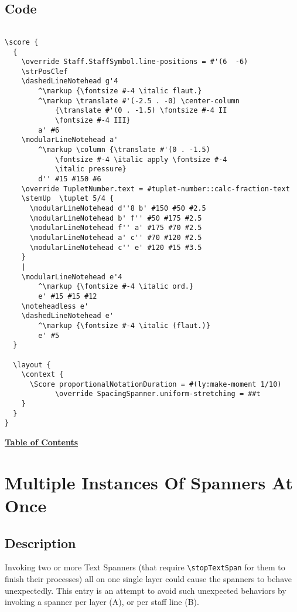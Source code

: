 \subsection{Code}
\begin{verbatim}

\score {
  {
    \override Staff.StaffSymbol.line-positions = #'(6  -6)
    \strPosClef 
    \dashedLineNotehead g'4
    	^\markup {\fontsize #-4 \italic flaut.}
    	^\markup \translate #'(-2.5 . -0) \center-column 
			{\translate #'(0 . -1.5) \fontsize #-4 II 
			\fontsize #-4 III} 
		a' #6
    \modularLineNotehead a'
    	^\markup \column {\translate #'(0 . -1.5) 
			\fontsize #-4 \italic apply \fontsize #-4 
			\italic pressure} 
		d'' #15 #150 #6
    \override TupletNumber.text = #tuplet-number::calc-fraction-text
    \stemUp  \tuplet 5/4 {
      \modularLineNotehead d''8 b' #150 #50 #2.5
      \modularLineNotehead b' f'' #50 #175 #2.5
      \modularLineNotehead f'' a' #175 #70 #2.5
      \modularLineNotehead a' c'' #70 #120 #2.5
      \modularLineNotehead c'' e' #120 #15 #3.5
    }
    |
    \modularLineNotehead e'4
    	^\markup {\fontsize #-4 \italic ord.} 
		e' #15 #15 #12
    \noteheadless e'
    \dashedLineNotehead e'
    	^\markup {\fontsize #-4 \italic (flaut.)} 
		e' #5
  }

  \layout {
    \context {
      \Score proportionalNotationDuration = #(ly:make-moment 1/10)    
      		\override SpacingSpanner.uniform-stretching = ##t
    }
  }
}

\end{verbatim}

\hyperref[sec:toc]{\textbf{Table of Contents}}

\vfill \break


\section {Multiple Instances Of Spanners At Once}
\label{sec:comb_spanners}
\hfill
{}
\hfill

\subsection{Description}
Invoking two or more Text Spanners (that require \verb|\stopTextSpan| for them to finish their processes) all on one single layer could cause the spanners to behave unexpectedly. This entry is an attempt to avoid such unexpected behaviors by invoking a spanner per layer (A), or per staff line (B).

